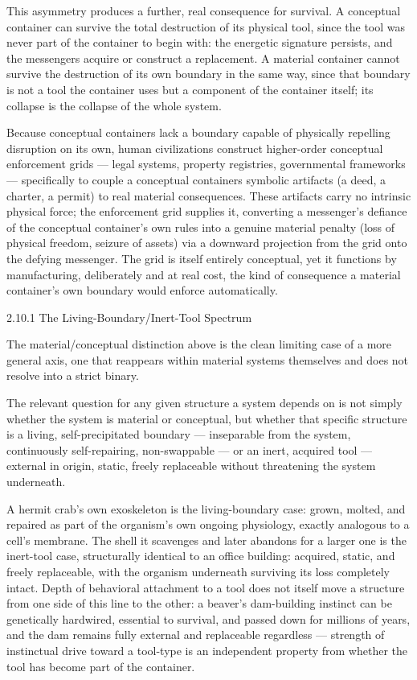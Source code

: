 \documentclass[
]{article}
\begin{document}
This asymmetry produces a further, real consequence for survival. A
conceptual container can survive the total destruction of its physical
tool, since the tool was never part of the container to begin with: the
energetic signature persists, and the messengers acquire or construct a
replacement. A material container cannot survive the destruction of its
own boundary in the same way, since that boundary is not a tool the
container uses but a component of the container itself; its collapse is
the collapse of the whole system.

Because conceptual containers lack a boundary capable of physically
repelling disruption on its own, human civilizations construct
higher-order conceptual enforcement grids --- legal systems, property
registries, governmental frameworks --- specifically to couple a
conceptual containers symbolic artifacts (a deed, a charter, a permit)
to real material consequences. These artifacts carry no intrinsic
physical force; the enforcement grid supplies it, converting a
messenger's defiance of the conceptual container's own rules into a
genuine material penalty (loss of physical freedom, seizure of assets)
via a downward projection from the grid onto the defying messenger. The
grid is itself entirely conceptual, yet it functions by manufacturing,
deliberately and at real cost, the kind of consequence a material
container's own boundary would enforce automatically.

2.10.1 The Living-Boundary/Inert-Tool Spectrum

The material/conceptual distinction above is the clean limiting case of
a more general axis, one that reappears within material systems
themselves and does not resolve into a strict binary.

The relevant question for any given structure a system depends on is not
simply whether the system is material or conceptual, but whether that
specific structure is a living, self-precipitated boundary ---
inseparable from the system, continuously self-repairing, non-swappable
--- or an inert, acquired tool --- external in origin, static, freely
replaceable without threatening the system underneath.

A hermit crab's own exoskeleton is the living-boundary case: grown,
molted, and repaired as part of the organism's own ongoing physiology,
exactly analogous to a cell's membrane. The shell it scavenges and later
abandons for a larger one is the inert-tool case, structurally identical
to an office building: acquired, static, and freely replaceable, with
the organism underneath surviving its loss completely intact. Depth of
behavioral attachment to a tool does not itself move a structure from
one side of this line to the other: a beaver's dam-building instinct can
be genetically hardwired, essential to survival, and passed down for
millions of years, and the dam remains fully external and replaceable
regardless --- strength of instinctual drive toward a tool-type is an
independent property from whether the tool has become part of the
container.
\end{document}
